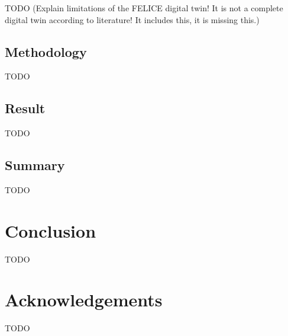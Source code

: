 \documentclass[conference]{IEEEtran}
\begin{document}
    TODO (Explain limitations of the FELICE digital twin! It is not a complete digital twin according to literature! It includes this, it is missing this.)

    \subsection{Methodology}
    \label{section:case_methodology}

    TODO

    \subsection{Result}
    \label{section:case_result}

    TODO

    \subsection{Summary}
    \label{section:case_summary}

    TODO

    \section{Conclusion}
    \label{section:conclusion}
    TODO

    \section*{Acknowledgements}
    TODO

    
    
\end{document}
